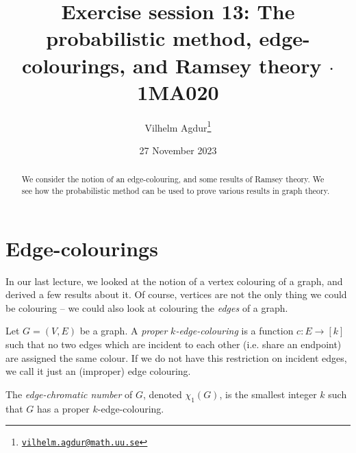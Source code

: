 \documentclass[nobib]{tufte-handout}
\title{Exercise session 13: The probabilistic method, edge-colourings, and Ramsey theory $\cdot$ 1MA020}
\author[Vilhelm Agdur]{Vilhelm Agdur\thanks{\href{mailto:vilhelm.agdur@math.uu.se}{\nolinkurl{vilhelm.agdur@math.uu.se}}}}
\date{27 November 2023}
\begin{document}
\maketitle%

\begin{abstract}
\noindent
We consider the notion of an edge-colouring, and some results of Ramsey theory. We see how the probabilistic method can be used to prove various results in graph theory.
\end{abstract}

\section{Edge-colourings}

In our last lecture, we looked at the notion of a vertex colouring of a graph, and derived a few results about it. Of course, vertices are not the only thing we could be colouring -- we could also look at colouring the \emph{edges} of a graph.

\begin{definition}
    Let $G = (V,E)$ be a graph. A \emph{proper} \emph{$k$-edge-colouring} is a function $c: E \to [k]$ such that no two edges which are incident to each other (i.e. share an endpoint) are assigned the same colour. If we do not have this restriction on incident edges, we call it just an (improper) edge colouring.

    The \emph{edge-chromatic number} of $G$, denoted $\chi_1(G)$, is the smallest integer $k$ such that $G$ has a proper $k$-edge-colouring.
\end{definition}
\end{document}
